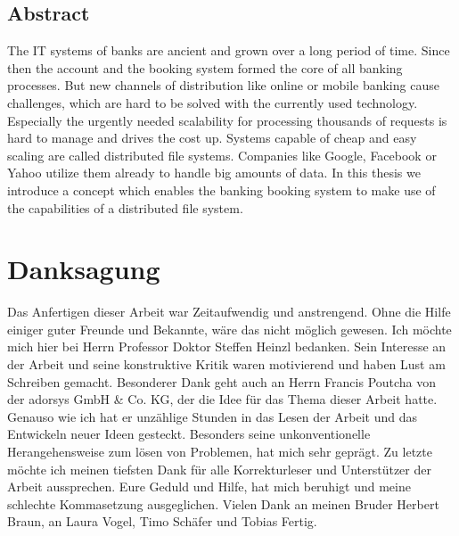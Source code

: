 \documentclass[12pt,oneside,a4paper,parskip]{scrbook}
\newcommand\blankpage{%
    \null
    \thispagestyle{empty}%
    \addtocounter{page}{-1}%
    \newpage}
\begin{document}
\section*{Abstract}

The IT systems of banks are ancient and grown over a long period of time. Since then the account and the booking system formed the core of all banking processes. But new channels of distribution like online or mobile banking cause challenges, which are hard to be solved with the currently used technology. Especially the urgently needed scalability for processing thousands of requests is hard to manage and drives the cost up. Systems capable of cheap and easy scaling are called distributed file systems. Companies like Google, Facebook or Yahoo utilize them already to handle big amounts of data. In this thesis we introduce a concept which enables the banking booking system to make use of the capabilities of a distributed file system.

\newpage
\chapter*{Danksagung}
Das Anfertigen dieser Arbeit war Zeitaufwendig und anstrengend. Ohne die Hilfe einiger guter Freunde und Bekannte, wäre das nicht möglich gewesen. Ich möchte mich hier bei Herrn Professor Doktor Steffen Heinzl bedanken. Sein Interesse an der Arbeit und seine konstruktive Kritik waren motivierend und haben Lust am Schreiben gemacht. Besonderer Dank geht auch an Herrn Francis Poutcha von der adorsys GmbH \& Co. KG, der die Idee für das Thema dieser Arbeit hatte. Genauso wie ich hat er unzählige Stunden in das Lesen der Arbeit und das Entwickeln neuer Ideen gesteckt. Besonders seine unkonventionelle Herangehensweise zum lösen von Problemen, hat mich sehr geprägt. Zu letzte möchte ich meinen tiefsten Dank für alle Korrekturleser und Unterstützer der Arbeit aussprechen. Eure Geduld und Hilfe, hat mich beruhigt und meine schlechte Kommasetzung ausgeglichen. Vielen Dank an meinen Bruder Herbert Braun, an Laura Vogel, Timo Schäfer und Tobias Fertig.

\tableofcontents										



\afterpage{\blankpage}
\mainmatter
\end{document}
